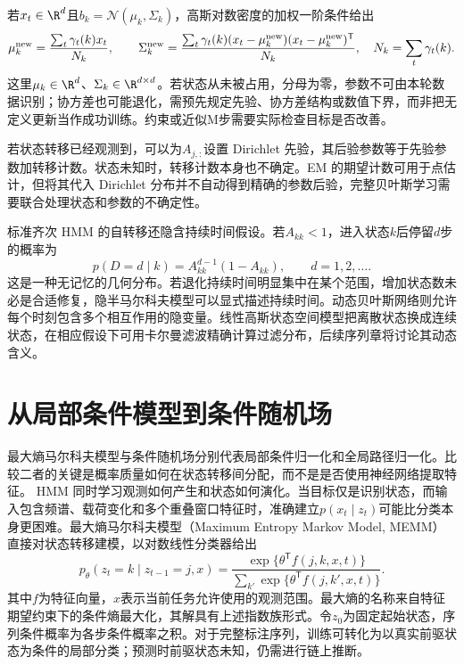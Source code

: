 若$x_t\in\R^d$且$b_k=\mathcal N(\mu_k,\Sigma_k)$，高斯对数密度的加权一阶条件给出
\begin{equation}
 \mu_k^{\rm new}=\frac{\sum_t\gamma_t(k)x_t}{N_k},\qquad
 \Sigma_k^{\rm new}=\frac{\sum_t\gamma_t(k)(x_t-\mu_k^{\rm new})(x_t-\mu_k^{\rm new})^{\mathsf T}}{N_k},
 \quad N_k=\sum_t\gamma_t(k).
\end{equation}
这里$\mu_k\in\R^d$、$\Sigma_k\in\R^{d\times d}$。若状态从未被占用，分母为零，参数不可由本轮数据识别；协方差也可能退化，需预先规定先验、协方差结构或数值下界，而非把无定义更新当作成功训练。约束或近似M步需要实际检查目标是否改善。

若状态转移已经观测到，可以为$A_{j,:}$设置 Dirichlet 先验，其后验参数等于先验参数加转移计数。状态未知时，转移计数本身也不确定。EM 的期望计数可用于点估计，但将其代入 Dirichlet 分布并不自动得到精确的参数后验，完整贝叶斯学习需要联合处理状态和参数的不确定性。

标准齐次 HMM 的自转移还隐含持续时间假设。若$A_{kk}<1$，进入状态$k$后停留$d$步的概率为
\begin{equation}
 p(D=d\mid k)=A_{kk}^{d-1}(1-A_{kk}),\qquad d=1,2,\ldots.
\end{equation}
这是一种无记忆的几何分布。若退化持续时间明显集中在某个范围，增加状态数未必是合适修复，隐半马尔科夫模型可以显式描述持续时间。动态贝叶斯网络则允许每个时刻包含多个相互作用的隐变量。线性高斯状态空间模型把离散状态换成连续状态，在相应假设下可用卡尔曼滤波精确计算过滤分布，后续序列章将讨论其动态含义。

\section{从局部条件模型到条件随机场}
最大熵马尔科夫模型与条件随机场分别代表局部条件归一化和全局路径归一化\cite{mccallum2000memm,lafferty2001crf}。比较二者的关键是概率质量如何在状态转移间分配，而不是是否使用神经网络提取特征。
HMM 同时学习观测如何产生和状态如何演化。当目标仅是识别状态，而输入包含频谱、载荷变化和多个重叠窗口特征时，准确建立$p(x_t\mid z_t)$可能比分类本身更困难。最大熵马尔科夫模型（Maximum Entropy Markov Model, MEMM）直接对状态转移建模，以对数线性分类器给出
\begin{equation}
 p_\theta(z_t=k\mid z_{t-1}=j,x)=
 \frac{\exp\{\theta^{\mathsf T}f(j,k,x,t)\}}
 {\sum_{k'}\exp\{\theta^{\mathsf T}f(j,k',x,t)\}}.
\end{equation}
其中$f$为特征向量，$x$表示当前任务允许使用的观测范围。最大熵的名称来自特征期望约束下的条件熵最大化，其解具有上述指数族形式。令$z_0$为固定起始状态，序列条件概率为各步条件概率之积。对于完整标注序列，训练可转化为以真实前驱状态为条件的局部分类；预测时前驱状态未知，仍需进行链上推断。

